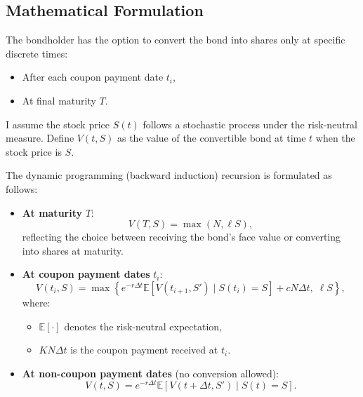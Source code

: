
\subsection{Mathematical Formulation}

The bondholder has the option to convert the bond into shares only at specific discrete times:
\begin{itemize}
    \item After each coupon payment date $t_i$,
    \item At final maturity $T$.
\end{itemize}

I assume the stock price $S(t)$ follows a stochastic process under the risk-neutral measure. Define $V(t, S)$ as the value of the convertible bond at time $t$ when the stock price is $S$.

The dynamic programming (backward induction) recursion is formulated as follows:
\begin{itemize}
    \item \textbf{At maturity} $T$:
    \begin{equation}
        V(T, S) = \max\left( N, \ell S \right),
    \end{equation}
    reflecting the choice between receiving the bond's face value or converting into shares at maturity.
    
    \item \textbf{At coupon payment dates} $t_i$:
    \begin{equation}
        V(t_i, S) = \max \left\{
            e^{-r \Delta t} \mathbb{E} \left[ V(t_{i+1}, S') \mid S(t_i) = S \right] + c N \Delta t, \;
            \ell S
        \right\},
    \end{equation}
    where:
    \begin{itemize}
        \item $\mathbb{E}[\cdot]$ denotes the risk-neutral expectation,
        \item $K N \Delta t$ is the coupon payment received at $t_i$.
    \end{itemize}
    
    \item \textbf{At non-coupon payment dates} (no conversion allowed):
    \begin{equation}
        V(t, S) = e^{-r \Delta t} \mathbb{E} \left[ V(t + \Delta t, S') \mid S(t) = S \right].
    \end{equation}
\end{itemize}

